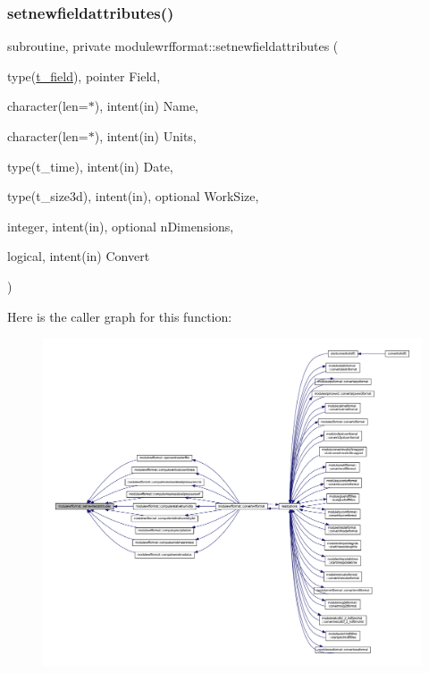 \subsubsection{\texorpdfstring{setnewfieldattributes()}{setnewfieldattributes()}}
{\footnotesize\ttfamily subroutine, private modulewrfformat\+::setnewfieldattributes (\begin{DoxyParamCaption}\item[{type(\mbox{\hyperlink{structmodulewrfformat_1_1t__field}{t\+\_\+field}}), pointer}]{Field,  }\item[{character(len=$\ast$), intent(in)}]{Name,  }\item[{character(len=$\ast$), intent(in)}]{Units,  }\item[{type(t\+\_\+time), intent(in)}]{Date,  }\item[{type(t\+\_\+size3d), intent(in), optional}]{Work\+Size,  }\item[{integer, intent(in), optional}]{n\+Dimensions,  }\item[{logical, intent(in)}]{Convert }\end{DoxyParamCaption})\hspace{0.3cm}{\ttfamily [private]}}

Here is the caller graph for this function\+:\nopagebreak
\begin{figure}[H]
\begin{center}
\leavevmode
\includegraphics[width=350pt]{namespacemodulewrfformat_a2b4e995c72ac3a14b042542f4fe14c13_icgraph}
\end{center}
\end{figure}
\mbox{\label{namespacemodulewrfformat_a39704adb6d59858e48b9581c11a17870}} 
